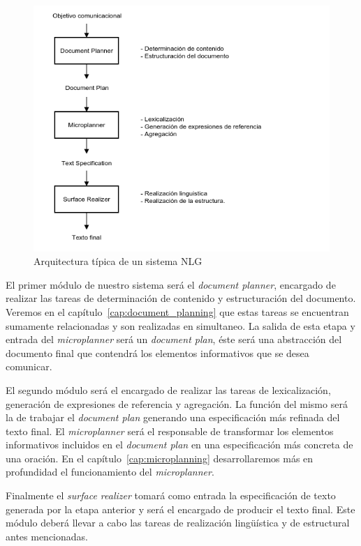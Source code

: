 \begin{figure}[h]
  	\centering
	\includegraphics[scale=0.6]{img/arquitectura.png}
	\caption{Arquitectura típica de un sistema NLG}
  	\label{fig:png_arquitectura}
\end{figure}

El primer módulo de nuestro sistema será el \emph{document planner}, encargado de realizar las tareas de determinación de contenido y estructuración del documento. Veremos en el capítulo~\ref{cap:document_planning} que estas tareas se encuentran sumamente relacionadas y son realizadas en simultaneo. La salida de esta etapa y entrada del \emph{microplanner} será un \emph{document plan}, éste será una abstracción del documento final que contendrá los elementos informativos que se desea comunicar.

El segundo módulo será el encargado de realizar las tareas de lexicalización, generación de expresiones de referencia y agregación. La función del mismo será la de trabajar el \textit{document plan} generando una especificación más refinada del texto final. El \emph{microplanner} será el responsable de transformar los elementos informativos incluidos en el \textit{document plan} en una especificación más concreta de una oración. En el capítulo~\ref{cap:microplanning} desarrollaremos más en profundidad el funcionamiento del \textit{microplanner}.

Finalmente el \emph{surface realizer} tomará como entrada la especificación de texto generada por la etapa anterior y será el encargado de producir el texto final. Este módulo deberá llevar a cabo las tareas de realización lingüística y de estructural antes mencionadas.

